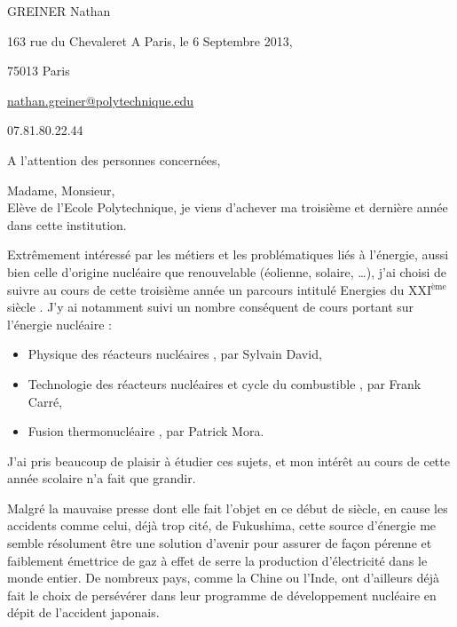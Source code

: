 \documentclass[a4paper,oneside,12pt]{article}
\begin{document}
\thispagestyle{empty}




\begin{flushleft}
GREINER Nathan

163 rue du Chevaleret \hspace{6.5cm} A Paris, le 6 Septembre 2013,

75013 Paris

\underline{nathan.greiner@polytechnique.edu}

07.81.80.22.44
\end{flushleft}

\vspace{2cm}

\begin{flushright}
A l'attention des personnes concernées,
\end{flushright}

\vspace{1cm}

Madame, Monsieur, \\

Elève de l'Ecole Polytechnique, je viens d'achever ma troisième et dernière année dans cette institution.

Extrêmement intéressé par les métiers et les problématiques liés à l'énergie, aussi bien celle d'origine nucléaire que renouvelable (éolienne, solaire, \dots), j'ai choisi de suivre au cours de cette troisième année un parcours intitulé \og Energies du XXI$^{\textrm{ème}}$ siècle \fg. J'y ai notamment suivi un nombre conséquent de cours portant sur l'énergie nucléaire :

\begin{itemize}
\item{\og Physique des réacteurs nucléaires \fg, par Sylvain David,}
\item{\og Technologie des réacteurs nucléaires et cycle du combustible \fg, par Frank Carré,}
\item{\og Fusion thermonucléaire \fg, par Patrick Mora.}
\end{itemize}
J'ai pris beaucoup de plaisir à étudier ces sujets, et mon intérêt au cours de cette année scolaire n'a fait que grandir.

Malgré la mauvaise presse dont elle fait l'objet en ce début de siècle, en cause les accidents comme celui, déjà trop cité, de Fukushima, cette source d'énergie me semble résolument être une solution d'avenir pour assurer de façon pérenne et faiblement émettrice de gaz à effet de serre la production d'électricité dans le monde entier. De nombreux pays, comme la Chine ou l'Inde, ont d'ailleurs déjà fait le choix de persévérer dans leur programme de développement nucléaire en dépit de l'accident japonais.
\end{document}
